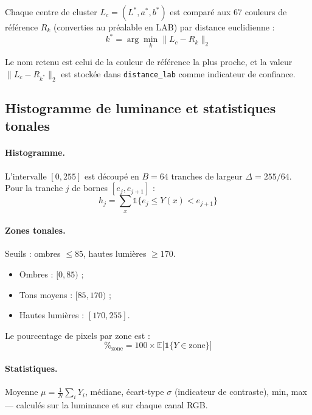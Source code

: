 \documentclass[11pt,a4paper]{article}
\begin{document}
Chaque centre de cluster $L_c = (L^*, a^*, b^*)$ est comparé aux 67
couleurs de référence $R_k$ (converties au préalable en LAB) par distance
euclidienne :
\begin{equation}
  k^* = \arg\min_{k} \lVert L_c - R_k \rVert_2
  \label{eq:naming}
\end{equation}

Le nom retenu est celui de la couleur de référence la plus proche, et la
valeur $\lVert L_c - R_{k^*} \rVert_2$ est stockée dans
\texttt{distance\_lab} comme indicateur de confiance.

\subsection{Histogramme de luminance et statistiques tonales}

\paragraph{Histogramme.}
L'intervalle $[0, 255]$ est découpé en $B = 64$ tranches de largeur
$\Delta = 255/64$. Pour la tranche $j$ de bornes $[e_j, e_{j+1}]$ :
\begin{equation}
  h_j = \sum_{x} \mathbb{1}\bigl\{ e_j \le Y(x) < e_{j+1} \bigr\}
  \label{eq:histogram}
\end{equation}

\paragraph{Zones tonales.}
Seuils : ombres $\leq 85$, hautes lumières $\geq 170$.
\begin{itemize}
  \item Ombres : $[0, 85)$ ;
  \item Tons moyens : $[85, 170)$ ;
  \item Hautes lumières : $[170, 255]$.
\end{itemize}
Le pourcentage de pixels par zone est :
\begin{equation}
  \%_\text{zone} = 100 \times \mathbb{E}\bigl[\mathbb{1}\{Y \in \text{zone}\}\bigr]
  \label{eq:zones}
\end{equation}

\paragraph{Statistiques.}
Moyenne $\mu = \frac{1}{N}\sum_i Y_i$, médiane, écart-type $\sigma$
(indicateur de contraste), min, max --- calculés sur la luminance et sur
chaque canal RGB.
\end{document}
